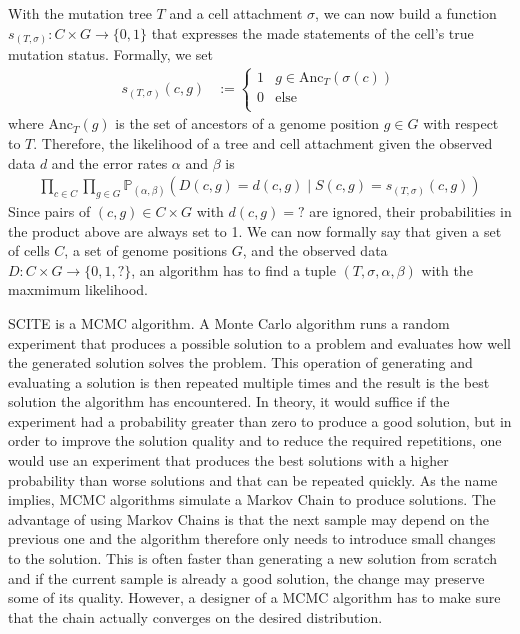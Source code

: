 With the mutation tree $T$ and a cell attachment $\sigma$, we can now build a function $s_{(T, \sigma)}: C \times G \rightarrow \{0, 1\}$ that expresses the made statements of the cell's true mutation status. Formally, we set
\begin{align*}
    s_{(T, \sigma)}(c, g) &:= \begin{cases}
        1 & g \in \mathrm{Anc}_T(\sigma(c)) \\
        0 & \text{else} \\
    \end{cases}
\end{align*}
where $\mathrm{Anc}_T(g)$ is the set of ancestors of a genome position $g \in G$ with respect to $T$. Therefore, the likelihood of a tree and cell attachment given the observed data $d$ and the error rates $\alpha$ and $\beta$ is
\begin{align*}
    \prod_{c \in C}\prod_{g \in G} \mathbb{P}_{(\alpha, \beta)}(D(c, g) = d(c, g) \mid S(c, g) = s_{(T, \sigma)}(c, g))
\end{align*}
Since pairs of $(c, g) \in C \times G$ with $d(c, g) = ?$ are ignored, their probabilities in the product above are always set to 1. We can now formally say that given a set of cells $C$, a set of genome positions $G$, and the observed data $D: C \times G \rightarrow \{0, 1, ?\}$, an algorithm has to find a tuple $(T, \sigma, \alpha, \beta)$ with the maxmimum likelihood.

\ac{SCITE} is a \ac{MCMC} algorithm. A Monte Carlo algorithm runs a random experiment that produces a possible solution to a problem and evaluates how well the generated solution solves the problem. This operation of generating and evaluating a solution is then repeated multiple times and the result is the best solution the algorithm has encountered. In theory, it would suffice if the experiment had a probability greater than zero to produce a good solution, but in order to improve the solution quality and to reduce the required repetitions, one would use an experiment that produces the best solutions with a higher probability than worse solutions and that can be repeated quickly. As the name implies, \ac{MCMC} algorithms simulate a Markov Chain to produce solutions. The advantage of using Markov Chains is that the next sample may depend on the previous one and the algorithm therefore only needs to introduce small changes to the solution. This is often faster than generating a new solution from scratch and if the current sample is already a good solution, the change may preserve some of its quality. However, a designer of a \ac{MCMC} algorithm has to make sure that the chain actually converges on the desired distribution.

